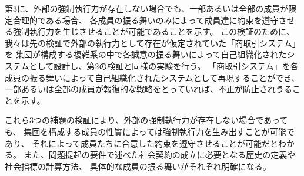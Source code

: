 第3に、外部の強制執行力が存在しない場合でも、一部あるいは全部の成員が限定合理的である場合、
各成員の振る舞いのみによって成員達に約束を遵守させる強制執行力を生じさせることが可能であることを示す。
この検証のために、我々は先の検証で外部の執行力として存在が仮定されていた「商取引システム」を
集団が構成する複雑系の中で各誠意の振る舞いによって自己組織化されたシステムとして設計し、第2の検証と同様の実験を行う。
「商取引システム」を各成員の振る舞いによって自己組織化されたシステムとして再現することができ、
一部あるいは全部の成員が報復的な戦略をとっていれば、不正が防止されうることを示す。

これら3つの補題の検証により、外部の強制執行力が存在しない場合であっても、
集団を構成する成員の性質によっては強制執行力を生み出すことが可能であり、
それによって成員たちに合意した約束を遵守させることが可能だとわかる。
また、問題提起の要件で述べた社会契約の成立に必要となる歴史の定義や社会指標の計算方法、
具体的な成員の振る舞いがそれぞれ明確になる。